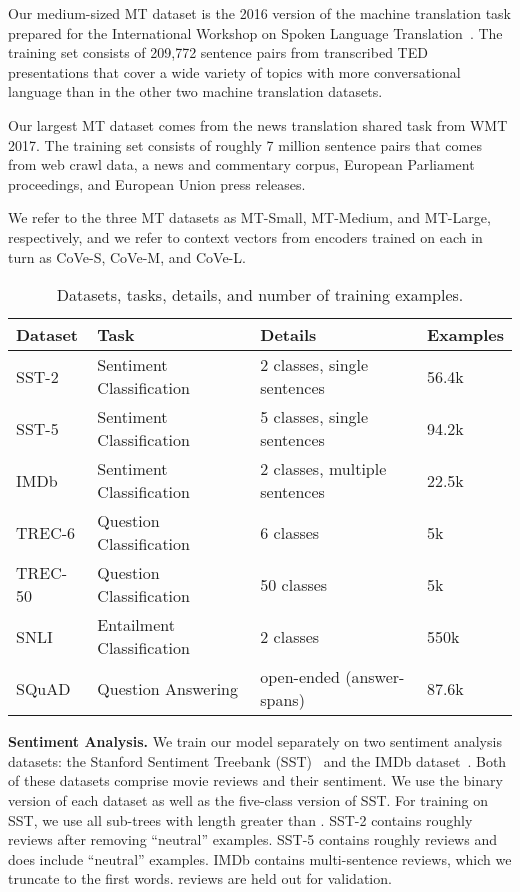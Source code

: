 \documentclass{article}
\begin{document}
Our medium-sized MT dataset is the 2016 version of the machine translation task prepared for the International Workshop on Spoken Language Translation~\citep{cettolo2015iwslt}. 
The training set consists of 209,772 sentence pairs from transcribed TED presentations that cover a wide variety of topics with more conversational language than in the other two machine translation datasets.

Our largest MT dataset comes from the news translation shared task from WMT 2017.
The training set consists of roughly 7 million sentence pairs that comes from web crawl data, a news and commentary corpus, European Parliament proceedings, and European Union press releases.

We refer to the three MT datasets as MT-Small, MT-Medium, and MT-Large, respectively,
and we refer to context vectors from encoders trained on each in turn as CoVe-S, CoVe-M, and CoVe-L.
\bigskip

\begin{table}
  \centering
\begin{tabular}{llll}
    \toprule
Dataset & Task & Details & Examples\\
\midrule
 SST-2   &Sentiment Classification & 2 classes, single sentences        & 56.4k\\
 SST-5   & Sentiment Classification & 5 classes, single sentences           &94.2k \\
 IMDb    & Sentiment Classification & 2 classes, multiple sentences          &22.5k   \\
TREC-6  & Question Classification& 6 classes & 5k  \\
  TREC-50 & Question Classification& 50 classes &5k  \\
SNLI    &Entailment Classification &  2 classes        &  550k \\
SQuAD & Question Answering & open-ended (answer-spans)  & 87.6k  \\
\bottomrule
  \end{tabular}
      \caption{Datasets, tasks, details, and number of training examples.}
      \vspace{-0.6cm}
  \label{tasks}
\end{table}

\textbf{Sentiment Analysis.} 
We train our model separately on two sentiment analysis datasets: the Stanford Sentiment Treebank (SST)~\citep{Socher2013EMNLP} and the IMDb dataset~\citep{maas-EtAl:2011:ACL-HLT2011}.
Both of these datasets comprise movie reviews and their sentiment.
We use the binary version of each dataset as well as the five-class version of SST.
For training on SST, we use all sub-trees with length greater than .
SST-2 contains roughly  reviews after removing ``neutral'' examples. 
SST-5 contains roughly  reviews and does include ``neutral'' examples.
IMDb contains  multi-sentence reviews, which we truncate to the first  words.  reviews are held out for validation. 
\end{document}
